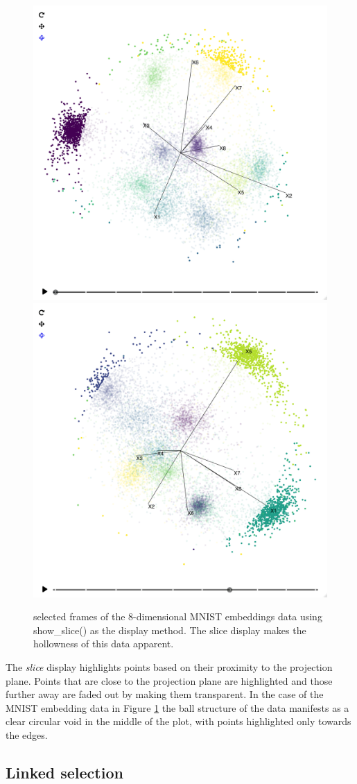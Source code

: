 \begin{figure}

{\centering \includegraphics[width=0.49\linewidth]{figures/mnist/mnist-8d-slice-1} \includegraphics[width=0.49\linewidth]{figures/mnist/mnist-8d-slice-2} 

}

\caption{selected frames of the 8-dimensional MNIST embeddings data using show\_slice() as the display method. The slice display makes the hollowness of this data apparent.}\label{fig:mnist-8d-slice}
\end{figure}

The \emph{slice} display highlights points based on their proximity to the projection plane. Points that are close to the projection plane are highlighted and those further away are faded out by making them transparent. In the case of the MNIST embedding data in Figure \ref{fig:mnist-8d-slice} the ball structure of the data manifests as a clear circular void in the middle of the plot, with points highlighted only towards the edges.

\hypertarget{sec:casestudylinked}{%
\subsection{Linked selection}\label{sec:casestudylinked}}

